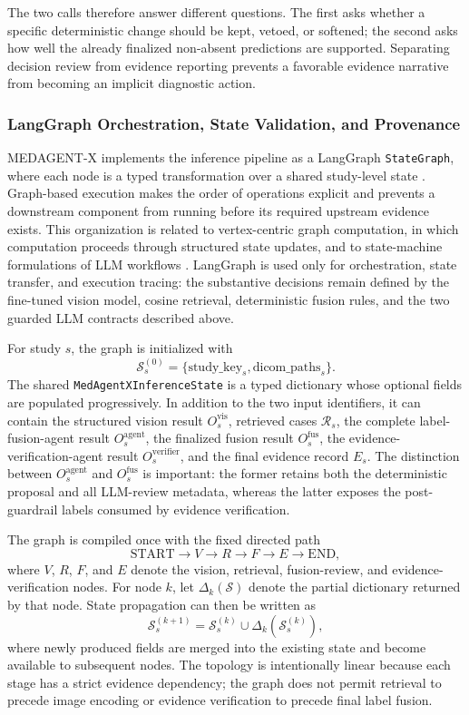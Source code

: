 The two calls therefore answer different questions. The first asks whether a specific deterministic change should be kept, vetoed, or softened; the second asks how well the already finalized non-absent predictions are supported. Separating decision review from evidence reporting prevents a favorable evidence narrative from becoming an implicit diagnostic action.

\subsubsection{LangGraph Orchestration, State Validation, and Provenance}

MEDAGENT-X implements the inference pipeline as a LangGraph \texttt{StateGraph}, where each node is a typed transformation over a shared study-level state \cite{langgraph2024}. Graph-based execution makes the order of operations explicit and prevents a downstream component from running before its required upstream evidence exists. This organization is related to vertex-centric graph computation, in which computation proceeds through structured state updates, and to state-machine formulations of LLM workflows \cite{malewicz2010pregel,stateflow2024}. LangGraph is used only for orchestration, state transfer, and execution tracing: the substantive decisions remain defined by the fine-tuned vision model, cosine retrieval, deterministic fusion rules, and the two guarded LLM contracts described above.

For study $s$, the graph is initialized with
\[
\mathcal S_s^{(0)}=
\{\mathrm{study\_key}_s,\mathrm{dicom\_paths}_s\}.
\]
The shared \texttt{MedAgentXInferenceState} is a typed dictionary whose optional fields are populated progressively. In addition to the two input identifiers, it can contain the structured vision result $O_s^{\mathrm{vis}}$, retrieved cases $\mathcal R_s$, the complete label-fusion-agent result $O_s^{\mathrm{agent}}$, the finalized fusion result $O_s^{\mathrm{fus}}$, the evidence-verification-agent result $O_s^{\mathrm{verifier}}$, and the final evidence record $E_s$. The distinction between $O_s^{\mathrm{agent}}$ and $O_s^{\mathrm{fus}}$ is important: the former retains both the deterministic proposal and all LLM-review metadata, whereas the latter exposes the post-guardrail labels consumed by evidence verification.

The graph is compiled once with the fixed directed path
\[
\mathrm{START}\rightarrow V\rightarrow R\rightarrow F\rightarrow E
\rightarrow\mathrm{END},
\]
where $V$, $R$, $F$, and $E$ denote the vision, retrieval, fusion-review, and evidence-verification nodes. For node $k$, let $\Delta_k(\mathcal S)$ denote the partial dictionary returned by that node. State propagation can then be written as
\[
\mathcal S_s^{(k+1)}=
\mathcal S_s^{(k)}\cup\Delta_k(\mathcal S_s^{(k)}),
\]
where newly produced fields are merged into the existing state and become available to subsequent nodes. The topology is intentionally linear because each stage has a strict evidence dependency; the graph does not permit retrieval to precede image encoding or evidence verification to precede final label fusion.

